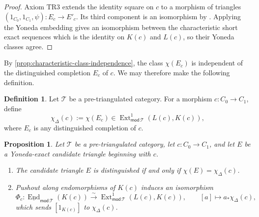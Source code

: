 \documentclass[a4paper,11pt,reqno]{amsart}
\newtheorem{proposition}[proposition]{Proposition}
\theoremstyle{definition}
\newtheorem{definition}[definition]{Definition}
\theoremstyle{plain}
\numberwithin{equation}{section}
\newcommand{\T}{\mathcal T}
\newcommand{\End}{\operatorname{End}}
\newcommand{\Ext}{\operatorname{Ext}}
\begin{document}
\begin{proof}
Axiom $\mathrm{TR3}$ extends the identity square on $c$ to a morphism of
triangles $(1_{C_0},1_{C_1},\psi):E_c\to E'_c$.  Its third component is an
isomorphism by \cite[Proposition~1.1.20]{Neeman2001}.  Applying the Yoneda
embedding gives an isomorphism between the characteristic short exact
sequences which is the identity on $K(c)$ and $L(c)$, so their Yoneda
classes agree.
\end{proof}

By \cref{prop:characteristic-class-independence}, the class $\chi(E_c)$ is
independent of the distinguished completion $E_c$ of $c$.  We may therefore
make the following definition.

\begin{definition}
\label{def:characteristic-class-pretriangulation}
Let $\T$ be a pre-triangulated category.  For a morphism
$c:C_0\to C_1$, define
\[
 \chi_\Delta(c):=\chi(E_c)
 \in\Ext^1_{\mathsf{mod}\,\T}(L(c),K(c)),
\]
where $E_c$ is any distinguished completion of $c$.
\end{definition}

\begin{proposition}
\label{prop:characteristic-extension}
Let $\T$ be a pre-triangulated category, let
$c:C_0\to C_1$, and let $E$ be a Yoneda-exact candidate triangle beginning with
$c$.
\begin{enumerate}[label=\textup{(\roman*)}]
\item The candidate triangle $E$ is distinguished if and only if
$\chi(E)=\chi_\Delta(c)$.
\item Pushout along endomorphisms of $K(c)$ induces an isomorphism
\begin{equation}
\label{eq:stable-unit}
 \Phi_c:
 \underline{\End}_{\mathsf{mod}\,\T}(K(c))
 \xrightarrow{\sim}
 \Ext^1_{\mathsf{mod}\,\T}(L(c),K(c)),
 \qquad
 [a]\longmapsto a_*\chi_\Delta(c),
\end{equation}
which sends $[1_{K(c)}]$ to $\chi_\Delta(c)$.
\end{enumerate}
\end{proposition}
\end{document}
